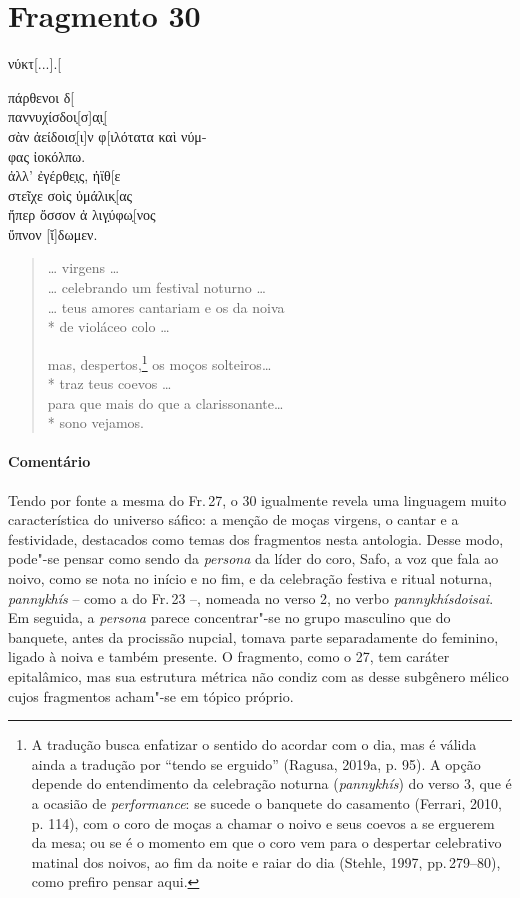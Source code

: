 {\pagebreak
\section{Fragmento 30}

\begin{gkverse}
νύκτ[...].[

πάρθενοι δ[\\
παννυχίσδοι̣[σ]α̣ι[̣\\
σὰν ἀείδοισ̣[ι]ν φ[ιλότατα καὶ νύμ-\\
φας ἰοκόλπω.\\
ἀλλ’ ἐγέρθε̣ι̣ς, ἠϊθ[ε\\
στεῖχε σοὶς ὐμάλικ̣[ας\\
ἤπερ ὄσσον ἀ λιγ̣ύφω̣[νος\\
ὔπνον [ἴ]δωμεν.
\end{gkverse}

\begin{verse}
\ldots{} virgens \ldots{}\\
\ldots{} celebrando um festival noturno \ldots{}\\
\ldots{} teus amores cantariam e os da noiva\\*
de violáceo colo \ldots{}

mas, despertos,\footnote{A tradução busca enfatizar o sentido do acordar com o dia, mas é válida ainda a tradução por ``tendo se erguido'' (Ragusa, 2019a, p. 95). A opção depende do entendimento da celebração noturna (\textit{pannykhís}) do verso 3, que é a ocasião de \textit{performance}:  se sucede o banquete do casamento (Ferrari, 2010, p. 114), com o coro de moças a chamar o noivo e seus coevos a se erguerem da mesa; ou se é o momento em que o coro vem para o despertar celebrativo matinal dos noivos, ao fim da noite e raiar do dia (Stehle, 1997, pp.\,279--80), como prefiro pensar aqui.} os moços solteiros\ldots{}\\*
traz teus coevos \ldots{}\\
para que mais do que a clarissonante\ldots{}\\*
sono vejamos.
\end{verse}
\pagebreak
{\paragraph{Comentário} Tendo por fonte a mesma do Fr.\,27, o 30 igualmente revela uma linguagem muito característica do universo sáfico: a menção de moças virgens, o cantar e a festividade, destacados como temas dos fragmentos nesta antologia. Desse modo, pode"-se pensar como sendo da \textit{persona} da líder do coro, Safo, a
voz que fala ao noivo, como se nota no início e no fim, e da celebração
festiva e ritual noturna, \textit{pannykhís} -- como a do Fr.\,23 --, nomeada no verso 2, no verbo \textit{pannykhísdoisai}. Em seguida, a \textit{persona} parece concentrar"-se no grupo masculino que do
banquete, antes da procissão nupcial, tomava parte separadamente do feminino,
ligado à noiva e também presente. O fragmento, como o 27, tem caráter
epitalâmico, mas sua estrutura métrica não condiz com as desse subgênero
mélico cujos fragmentos acham"-se em tópico próprio.}

}
